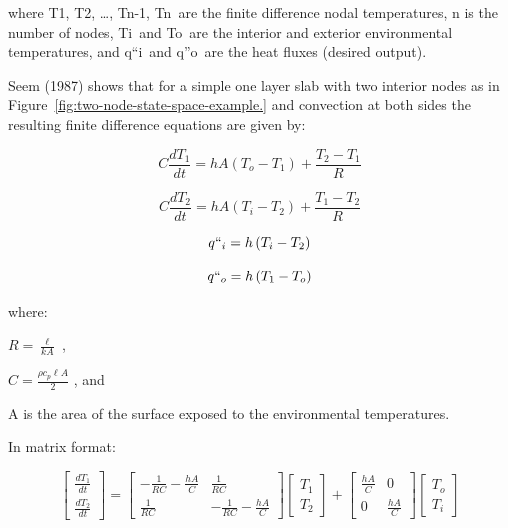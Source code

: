 where T1, T2, \ldots{}, Tn-1, Tn~are the finite difference nodal temperatures, n is the number of nodes, Ti~and To~are the interior and exterior environmental temperatures, and q``i~and q''o~are the heat fluxes (desired output).

Seem (1987) shows that for a simple one layer slab with two interior nodes as in Figure~\ref{fig:two-node-state-space-example.} and convection at both sides the resulting finite difference equations are given by:

\begin{equation}
C\frac{{d{T_1}}}{{dt}} = hA\left( {{T_o} - {T_1}} \right) + \frac{{{T_2} - {T_1}}}{R}
\end{equation}

\begin{equation}
C\frac{{d{T_2}}}{{dt}} = hA\left( {{T_i} - {T_2}} \right) + \frac{{{T_1} - {T_2}}}{R}
\end{equation}

\begin{equation}
q{``_i} = h\left( {{T_i} - {T_2}} \right)
\end{equation}

\begin{equation}
q{``_o} = h\left( {{T_1} - {T_o}} \right)
\end{equation}

where:

\(R = \frac{\ell }{{kA}}\) ,

\(C = \frac{{\rho {c_p}\ell A}}{2}\) , and

A is the area of the surface exposed to the environmental temperatures.

In matrix format:

\begin{equation}
\left[\begin{array}{c}\frac{dT_1}{dt} \\ \frac{dT_2}{dt}\end{array}\right] = 
     \left[\begin{array}{cc}-\frac{1}{RC}-\frac{hA}{C} & \frac{1}{RC} \\ \frac{1}{RC} & -\frac{1}{RC}-\frac{hA}{C}\end{array}\right]\left[\begin{array}{c}T_1 \\ T_2\end{array}\right] + 
     \left[\begin{array}{cc}\frac{hA}{C} & 0 \\ 0 & \frac{hA}{C}\end{array}\right]\left[\begin{array}{c}T_o \\ T_i\end{array}\right]
\end{equation}

